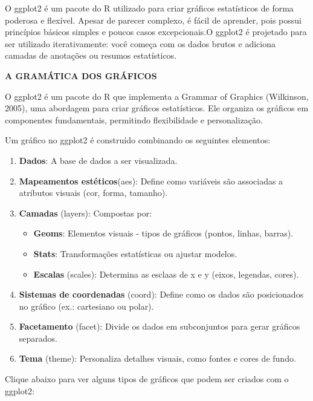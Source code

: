 \documentclass[
  letterpaper,
  DIV=11,
  numbers=noendperiod]{scrreprt}
\providecommand{\tightlist}{%
  \setlength{\itemsep}{0pt}\setlength{\parskip}{0pt}}
\begin{document}
O ggplot2 é um pacote do R utilizado para criar gráficos estatísticos de
forma poderosa e flexível. Apesar de parecer complexo, é fácil de
aprender, pois possui princípios básicos simples e poucos casos
excepcionais.O ggplot2 é projetado para ser utilizado iterativamente:
você começa com os dados brutos e adiciona camadas de anotações ou
resumos estatísticos.

\textbf{A GRAMÁTICA DOS GRÁFICOS}

O ggplot2 é um pacote do R que implementa a Grammar of Graphics
(Wilkinson, 2005), uma abordagem para criar gráficos estatísticos. Ele
organiza os gráficos em componentes fundamentais, permitindo
flexibilidade e personalização.

Um gráfico no ggplot2 é construído combinando os seguintes elementos:

\begin{enumerate}
\def\labelenumi{\arabic{enumi}.}
\tightlist
\item
  \textbf{Dados}: A base de dados a ser visualizada.
\item
  \textbf{Mapeamentos estéticos}(aes): Define como variáveis são
  associadas a atributos visuais (cor, forma, tamanho).
\item
  \textbf{Camadas} (layers): Compostas por:

  \begin{itemize}
  \tightlist
  \item
    \textbf{Geoms}: Elementos visuais - tipos de gráficos (pontos,
    linhas, barras).
  \item
    \textbf{Stats}: Transformações estatísticas ou ajustar modelos.
  \item
    \textbf{Escalas} (scales): Determina as esclaas de x e y (eixos,
    legendas, cores).
  \end{itemize}
\item
  \textbf{Sistemas de coordenadas} (coord): Define como os dados são
  posicionados no gráfico (ex.: cartesiano ou polar).
\item
  \textbf{Facetamento} (facet): Divide os dados em subconjuntos para
  gerar gráficos separados.
\item
  \textbf{Tema} (theme): Personaliza detalhes visuais, como fontes e
  cores de fundo.
\end{enumerate}

Clique abaixo para ver alguns tipos de gráficos que podem ser criados
com o ggplot2:
\end{document}
